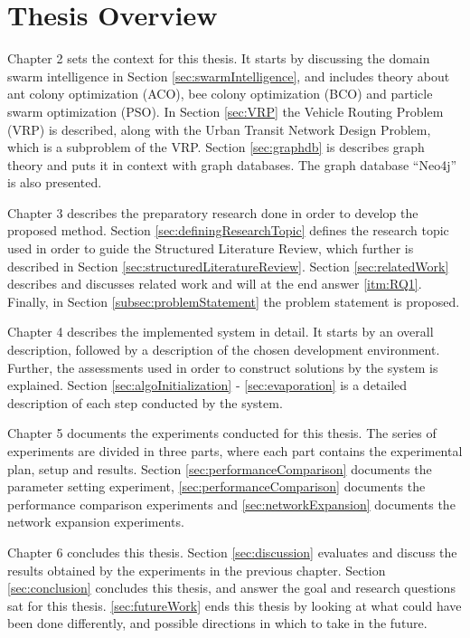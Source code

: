 \section{Thesis Overview}



Chapter 2 sets the context for this thesis. It starts by discussing the domain swarm intelligence in Section \ref{sec:swarmIntelligence}, and includes theory about ant colony optimization (ACO), bee colony optimization (BCO) and particle swarm optimization (PSO). In Section \ref{sec:VRP} the Vehicle Routing Problem (VRP) is described, along with the Urban Transit Network Design Problem, which is a subproblem of the VRP. Section \ref{sec:graphdb} is describes graph theory and puts it in context with graph databases. The graph database ``Neo4j'' is also presented. 

Chapter 3 describes the preparatory research done in order to develop the proposed method. Section \ref{sec:definingResearchTopic} defines the research topic used in order to guide the Structured Literature Review\citep{kofod2014}, which further is described in Section \ref{sec:structuredLiteratureReview}. Section \ref{sec:relatedWork} describes and discusses related work and will at the end answer \ref{itm:RQ1}. Finally, in Section \ref{subsec:problemStatement} the problem statement is proposed.  

Chapter 4 describes the implemented system in detail. It starts by an overall description, followed by a description of the chosen development environment. Further, the assessments used in order to construct solutions by the system is explained. Section \ref{sec:algoInitialization} - \ref{sec:evaporation} is a detailed description of each step conducted by the system.

Chapter 5 documents the experiments conducted for this thesis. The series of experiments are divided in three parts, where each part contains the experimental plan, setup and results. Section \ref{sec:performanceComparison} documents the parameter setting experiment, \ref{sec:performanceComparison} documents the performance comparison experiments and \ref{sec:networkExpansion} documents the network expansion experiments.

Chapter 6 concludes this thesis. Section \ref{sec:discussion} evaluates and discuss the results obtained by the experiments in the previous chapter. Section \ref{sec:conclusion} concludes this thesis, and answer the goal and research questions sat for this thesis. \ref{sec:futureWork} ends this thesis by looking at what could have been done differently, and possible directions in which to take in the future. 

